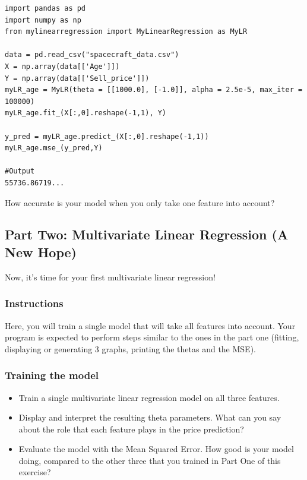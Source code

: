 \documentclass{42-en}
\begin{document}
\begin{verbatim}
import pandas as pd
import numpy as np
from mylinearregression import MyLinearRegression as MyLR

data = pd.read_csv("spacecraft_data.csv")
X = np.array(data[['Age']])
Y = np.array(data[['Sell_price']])
myLR_age = MyLR(theta = [[1000.0], [-1.0]], alpha = 2.5e-5, max_iter = 100000)
myLR_age.fit_(X[:,0].reshape(-1,1), Y)

y_pred = myLR_age.predict_(X[:,0].reshape(-1,1)) 
myLR_age.mse_(y_pred,Y)

#Output
55736.86719...
\end{verbatim}

How accurate is your model when you only take one feature into account?

\subsection*{Part Two: Multivariate Linear Regression (A New Hope)}

Now, it's time for your first multivariate linear regression!

\subsubsection*{Instructions}
Here, you will train a single model that will take all features into account.
Your program is expected to perform steps similar to the ones in the part one (fitting, displaying or generating 3 graphs, printing the thetas and the MSE).

\subsubsection*{Training the model}
\begin{itemize}
  \item Train a single multivariate linear regression model on all three features.
  \item Display and interpret the resulting theta parameters.
        What can you say about the role that each feature plays in the price prediction?
  \item Evaluate the model with the Mean Squared Error.
        How good is your model doing, compared to the other three that you trained in Part One of this exercise?
\end{itemize}
\end{document}

